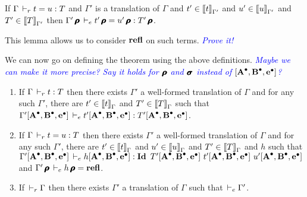 \documentclass[a4paper,english]{lipics-utf8x}
\newcommand\meta[1]{\noindent\textcolor{blue}{\emph{#1}}}
\begin{document}
  \begin{lemma}
    If $\Gamma \derr t = u : T$ and $\Gamma'$ is a translation of $\Gamma$ and
    $t' \in \tr{t}{\Gamma'}$ and $u' \in \tr{u}{\Gamma'}$ and
    $T' \in \tr{T}{\Gamma'}$ then
    $\Gamma'\prfl \dere t'\prfl = u'\prfl : T'\prfl$.
  \end{lemma}

  \noindent
  This lemma allows us to consider $\refl$ on such terms.
  \meta{Prove it!}


  We can now go on defining the theorem using the above definitions.
  \meta{Maybe we can make it more precise? Say it holds for $\prfl$ and $\pfull$
  instead of $\pany$?}

  \begin{theorem}[Translation]
    \label{thm:transl}
    \leavevmode
    \begin{enumerate}
      \item If $\Gamma \derr t : T$ then there exists $\Gamma'$ a well-formed
      translation of $\Gamma$ and for any such $\Gamma'$, there are
      $t' \in \tr{t}{\Gamma}$ and $T' \in \tr{T}{\Gamma}$
      such that $\Gamma'\pany \dere t'\pany : T'\pany$.
      \item If $\Gamma \derr t = u : T$ then there exists $\Gamma'$ a
      well-formed translation of $\Gamma$ and for any such $\Gamma'$, there are
      $t' \in \tr{t}{\Gamma}$ and $u' \in \tr{u}{\Gamma}$ and
      $T' \in \tr{T}{\Gamma}$ and $h$ such that
      $\Gamma'\pany \dere h\pany : \Id T'\pany\ t'\pany\ u'\pany$ and
      $\Gamma'\prfl \dere h\prfl = \refl$.
      \item If $\derr \Gamma$ then there exists $\Gamma'$ a translation of
      $\Gamma$ such that $\dere \Gamma'$.
    \end{enumerate}
  \end{theorem}
\end{document}

